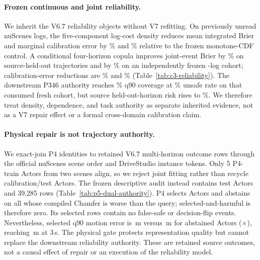 \paragraph{Frozen continuous and joint reliability.}
We inherit the V6.7 reliability objects without V7 refitting. On \PrelMarginalFreshLogs{} previously unread nuScenes logs,
the five-component log-cost density reduces mean integrated Brier and marginal calibration error by
\PrelMarginalBrierGain{}\% and \PrelMarginalCalibGain{}\% relative to the frozen monotone-CDF control. A conditional
four-horizon copula improves joint-event Brier by \PrelJointDevBrierGain{}\% on source-held-out trajectories and by
\PrelJointFreshBrierGain{}\% on an independently frozen \PrelJointFreshLogs{}-log cohort; calibration-error reductions are
\PrelJointDevCalibGain{}\% and \PrelJointFreshCalibGain{}\% (Table~\ref{tab:c3-reliability}). The downstream P346 authority
reaches \PrelAuthorityFreshCoverage{}\% q90 coverage at \PrelAuthorityFreshUnsafe{}\% unsafe rate on that consumed fresh
cohort, but source held-out-horizon risk rises to \PrelAuthorityHeldoutUnsafe{}\%. We therefore treat density, dependence,
and task authority as separate inherited evidence, not as a V7 repair effect or a formal cross-domain calibration claim.





\paragraph{Physical repair is not trajectory authority.}
We exact-join P4 identities to retained V6.7 multi-horizon outcome rows through the official nuScenes scene order and
DriveStudio instance tokens. Only 5 P4-train Actors from two scenes align, so we reject joint fitting rather than recycle
calibration/test Actors. The frozen descriptive audit instead contains \PfiveActors{} test Actors and 39,285 rows
(Table~\ref{tab:p5-dual-authority}). P4 selects \PfiveSelectedActors{} Actors and abstains on all \PfiveHarmActors{} whose
compiled Chamfer is worse than the query; selected-and-harmful is therefore zero. Its \PfiveSelectedRows{} selected rows contain
no false-safe or decision-flip events. Nevertheless, selected q90 motion error is \PfiveSelectedQError{}\,m versus
\PfiveAbstainedQError{}\,m for abstained Actors (\PfiveErrorRatio{}$\times$), reaching \PfiveThreeSecondQError{}\,m at 3\,s.
The physical gate protects representation quality but cannot replace the downstream reliability authority. These are retained
source outcomes, not a causal effect of repair or an execution of the reliability model.

